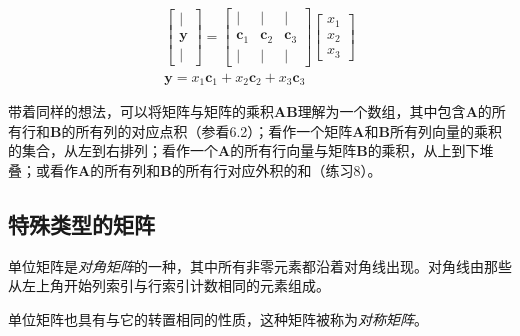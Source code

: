 \documentclass[lang=cn,12pt,marginpar=margintrue]{elegantbook}
\begin{document}
\[
  \begin{array}{c}
    {\left[\begin{array}{c}
                 \mid       \\
                 \mathbf{y} \\
                 \mid
               \end{array}\right]=\left[\begin{array}{ccc}
                                          \mid           & \mid           & \mid           \\
                                          \mathbf{c}_{1} & \mathbf{c}_{2} & \mathbf{c}_{3} \\
                                          \mid           & \mid           & \mid
                                        \end{array}\right]\left[\begin{array}{l}
                                                                  x_{1} \\
                                                                  x_{2} \\
                                                                  x_{3}
                                                                \end{array}\right]} \\
    \mathbf{y}=x_{1} \mathbf{c}_{1}+x_{2} \mathbf{c}_{2}+x_{3} \mathbf{c}_{3}
  \end{array}
\]

带着同样的想法，可以将矩阵与矩阵的乘积$\mathbf{AB}$理解为一个数组，其中包含$\mathbf{A}$的所有行和$\mathbf{B}$的所有列的对应点积（参看6.2）；看作一个矩阵$\mathbf{A}$和$\mathbf{B}$所有列向量的乘积的集合，从左到右排列；看作一个$\mathbf{A}$的所有行向量与矩阵$\mathbf{B}$的乘积，从上到下堆叠；或看作$\mathbf{A}$的所有列和$\mathbf{B}$的所有行对应外积的和（练习8）。

\subsection{特殊类型的矩阵}

单位矩阵是\textit{对角矩阵}的一种，其中所有非零元素都沿着对角线出现。对角线由那些从左上角开始列索引与行索引计数相同的元素组成。

单位矩阵也具有与它的转置相同的性质，这种矩阵被称为\textit{对称矩阵}。

\end{document}
